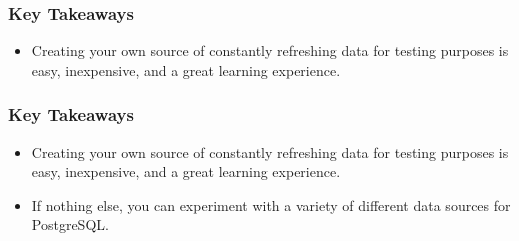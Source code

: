 \documentclass[aspectratio=169]{beamer}
\begin{document}
\begin{frame}
  \frametitle{Key Takeaways}
  \begin{itemize}
    \item Creating your own source of constantly refreshing data for testing purposes is easy, inexpensive, and a great learning experience.
  \end{itemize}
\end{frame}
\begin{frame}
  \frametitle{Key Takeaways}
  \begin{itemize}
    \item Creating your own source of constantly refreshing data for testing purposes is easy, inexpensive, and a great learning experience.
    \item If nothing else, you can experiment with a variety of different data sources for PostgreSQL.
  \end{itemize}
\end{frame}
\end{document}
